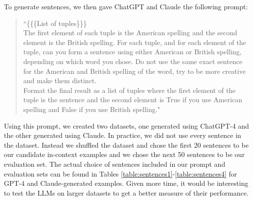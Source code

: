 \documentclass{article}
\begin{document}
To generate sentences, we then gave ChatGPT and Claude the following prompt:
\begin{center}
\begin{quote}
   ``\{\{\{List of tuples\}\}\}
\\[10pt]    
The first element of each tuple is the American spelling and the second element is the British spelling. For each tuple, and for each element of the tuple, can you form a sentence using either American or British spelling, depending on which word you chose. Do not use the same exact sentence for the American and British spelling of the word, try to be more creative and make them distinct.
\\[5pt]   
Format the final result as a list of tuples where the first element of the tuple is the sentence and the second element is True if you use American spelling and False if you use British spelling."
\end{quote}
\end{center}
Using this prompt, we created two datasets, one generated using ChatGPT-4 and the other generated using Claude. 
In practice, we did not use every sentence in the dataset. Instead we shuffled the dataset and chose the first 20 sentences to be our candidate in-context examples and we chose the next 50 sentences to be our evaluation set. The actual choice of sentences included in our prompt and evaluation sets can be found in Tables \ref{table:sentences1}-\ref{table:sentences4} for GPT-4 and Claude-generated examples. Given more time, it would be interesting to test the LLMs on larger datasets to get a better measure of their performance.
\end{document}

